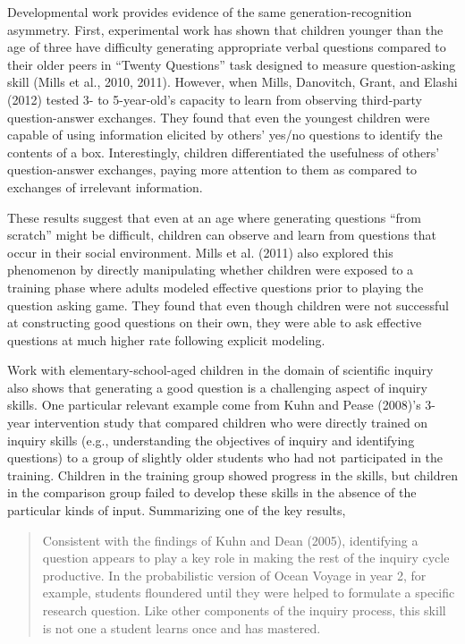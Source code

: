 \documentclass[english,floatsintext,man]{apa6}
\theoremstyle{definition}
\theoremstyle{definition}
\theoremstyle{definition}
\theoremstyle{remark}
\begin{document}
Developmental work provides evidence of the same generation-recognition
asymmetry. First, experimental work has shown that children younger than
the age of three have difficulty generating appropriate verbal questions
compared to their older peers in \enquote{Twenty Questions} task
designed to measure question-asking skill (Mills et al., 2010, 2011).
However, when Mills, Danovitch, Grant, and Elashi (2012) tested 3- to
5-year-old's capacity to learn from observing third-party
question-answer exchanges. They found that even the youngest children
were capable of using information elicited by others' yes/no questions
to identify the contents of a box. Interestingly, children
differentiated the usefulness of others' question-answer exchanges,
paying more attention to them as compared to exchanges of irrelevant
information.

These results suggest that even at an age where generating questions
\enquote{from scratch} might be difficult, children can observe and
learn from questions that occur in their social environment. Mills et
al. (2011) also explored this phenomenon by directly manipulating
whether children were exposed to a training phase where adults modeled
effective questions prior to playing the question asking game. They
found that even though children were not successful at constructing good
questions on their own, they were able to ask effective questions at
much higher rate following explicit modeling.

Work with elementary-school-aged children in the domain of scientific
inquiry also shows that generating a good question is a challenging
aspect of inquiry skills. One particular relevant example come from Kuhn
and Pease (2008)'s 3-year intervention study that compared children who
were directly trained on inquiry skills (e.g., understanding the
objectives of inquiry and identifying questions) to a group of slightly
older students who had not participated in the training. Children in the
training group showed progress in the skills, but children in the
comparison group failed to develop these skills in the absence of the
particular kinds of input. Summarizing one of the key results,

\begin{quote}
Consistent with the findings of Kuhn and Dean (2005), identifying a
question appears to play a key role in making the rest of the inquiry
cycle productive. In the probabilistic version of Ocean Voyage in year
2, for example, students floundered until they were helped to formulate
a specific research question. Like other components of the inquiry
process, this skill is not one a student learns once and has mastered.
\end{quote}
\end{document}
